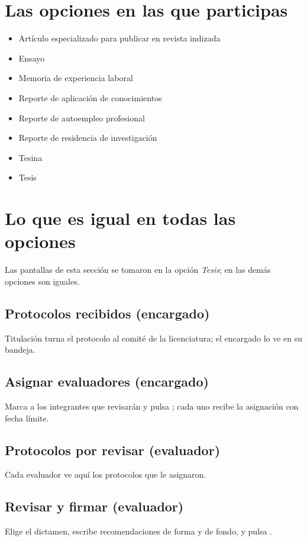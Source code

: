\section{Las opciones en las que participas}
\begin{itemize}
  \item Artículo especializado para publicar en revista indizada
  \item Ensayo
  \item Memoria de experiencia laboral
  \item Reporte de aplicación de conocimientos
  \item Reporte de autoempleo profesional
  \item Reporte de residencia de investigación
  \item Tesina
  \item Tesis
\end{itemize}
\section{Lo que es igual en todas las opciones}
Las pantallas de esta sección se tomaron en la opción \emph{Tesis}; en las demás opciones son iguales.
\subsection{Protocolos recibidos (encargado)}
Titulación turna el protocolo al comité de la licenciatura; el encargado lo ve en su bandeja.
\subsection{Asignar evaluadores (encargado)}
Marca a los integrantes que revisarán y pulsa ; cada uno recibe la asignación con fecha límite.
\subsection{Protocolos por revisar (evaluador)}
Cada evaluador ve aquí los protocolos que le asignaron.
\subsection{Revisar y firmar (evaluador)}
Elige el dictamen, escribe recomendaciones de forma y de fondo, y pulsa .
